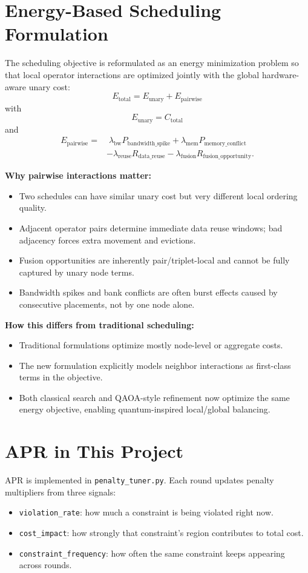 \documentclass[11pt]{article}
\begin{document}
\section{Energy-Based Scheduling Formulation}
The scheduling objective is reformulated as an energy minimization problem so that local operator interactions are optimized jointly with the global hardware-aware unary cost:
\[
E_{\text{total}} = E_{\text{unary}} + E_{\text{pairwise}}
\]
with
\[
E_{\text{unary}} = C_{\text{total}}
\]
and
\[
\begin{aligned}
E_{\text{pairwise}} =
&\;\lambda_{\text{bw}}P_{\text{bandwidth\_spike}}
+ \lambda_{\text{mem}}P_{\text{memory\_conflict}} \\
&- \lambda_{\text{reuse}}R_{\text{data\_reuse}}
- \lambda_{\text{fusion}}R_{\text{fusion\_opportunity}}.
\end{aligned}
\]

\textbf{Why pairwise interactions matter:}
\begin{itemize}
    \item Two schedules can have similar unary cost but very different local ordering quality.
    \item Adjacent operator pairs determine immediate data reuse windows; bad adjacency forces extra movement and evictions.
    \item Fusion opportunities are inherently pair/triplet-local and cannot be fully captured by unary node terms.
    \item Bandwidth spikes and bank conflicts are often burst effects caused by consecutive placements, not by one node alone.
\end{itemize}

\textbf{How this differs from traditional scheduling:}
\begin{itemize}
    \item Traditional formulations optimize mostly node-level or aggregate costs.
    \item The new formulation explicitly models neighbor interactions as first-class terms in the objective.
    \item Both classical search and QAOA-style refinement now optimize the same energy objective, enabling quantum-inspired local/global balancing.
\end{itemize}

\section{APR in This Project}
APR is implemented in \texttt{penalty\_tuner.py}. Each round updates penalty multipliers from three signals:
\begin{itemize}
    \item \texttt{violation\_rate}: how much a constraint is being violated right now.
    \item \texttt{cost\_impact}: how strongly that constraint's region contributes to total cost.
    \item \texttt{constraint\_frequency}: how often the same constraint keeps appearing across rounds.
\end{itemize}
\end{document}
